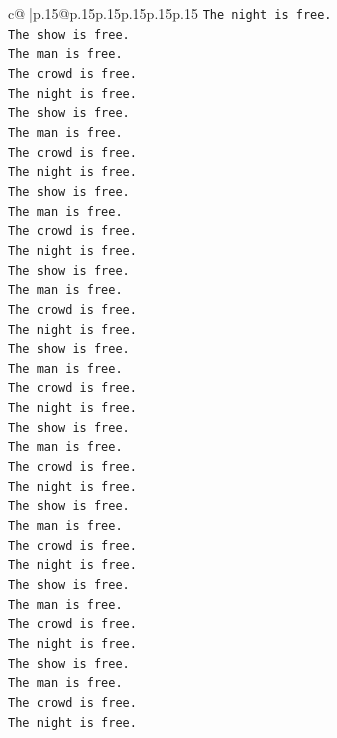 \documentclass{article}
\begin{document}
{\begin{supertabular}{c@{$\;$}|p{.15\linewidth}@{}p{.15\linewidth}p{.15\linewidth}p{.15\linewidth}p{.15\linewidth}p{.15\linewidth}}
{{{\texttt{The night is free.} \\
\texttt{The show is free.} \\
\texttt{The man is free.} \\
\texttt{The crowd is free.} \\
\texttt{The night is free.} \\
\texttt{The show is free.} \\
\texttt{The man is free.} \\
\texttt{The crowd is free.} \\
\texttt{The night is free.} \\
\texttt{The show is free.} \\
\texttt{The man is free.} \\
\texttt{The crowd is free.} \\
\texttt{The night is free.} \\
\texttt{The show is free.} \\
\texttt{The man is free.} \\
\texttt{The crowd is free.} \\
\texttt{The night is free.} \\
\texttt{The show is free.} \\
\texttt{The man is free.} \\
\texttt{The crowd is free.} \\
\texttt{The night is free.} \\
\texttt{The show is free.} \\
\texttt{The man is free.} \\
\texttt{The crowd is free.} \\
\texttt{The night is free.} \\
\texttt{The show is free.} \\
\texttt{The man is free.} \\
\texttt{The crowd is free.} \\
\texttt{The night is free.} \\
\texttt{The show is free.} \\
\texttt{The man is free.} \\
\texttt{The crowd is free.} \\
\texttt{The night is free.} \\
\texttt{The show is free.} \\
\texttt{The man is free.} \\
\texttt{The crowd is free.} \\
\texttt{The night is free.} \\
}}}
\end{supertabular}}
\end{document}
